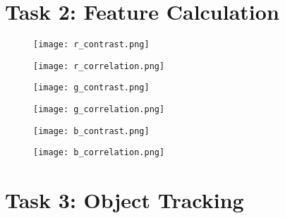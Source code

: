 \documentclass{report}
\begin{document}
\begin{appendices}
\pagebreak



\chapter{Task 2: Feature Calculation}\label{sec:app_task_2}

\begin{figure}
    \texttt{[image: r\_contrast.png]}
\end{figure}

\begin{figure}
    \texttt{[image: r\_correlation.png]}
\end{figure}

\begin{figure}
    \texttt{[image: g\_contrast.png]}
\end{figure}

\begin{figure}
    \texttt{[image: g\_correlation.png]}
\end{figure}

\begin{figure}
    \texttt{[image: b\_contrast.png]}
\end{figure}

\begin{figure}
    \texttt{[image: b\_correlation.png]}
\end{figure}

\pagebreak



\chapter{Task 3: Object Tracking} \label{sec:app_task3}



\end{appendices}
\end{document}
